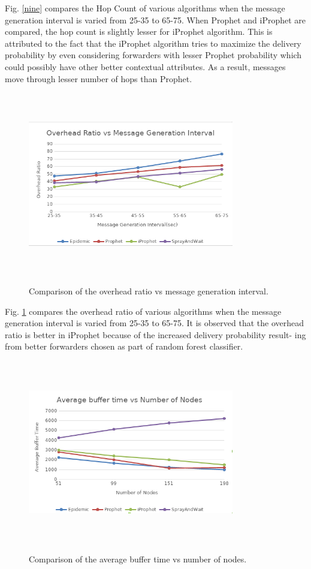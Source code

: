 \documentclass[10pt,journal]{IEEEtran}
\begin{document}
Fig. \ref{nine} compares the Hop Count of various algorithms when the message generation interval is varied from 25-35 to 65-75. When Prophet and iProphet are compared, the hop count is slightly lesser for iProphet algorithm. This is attributed to the fact that the iProphet algorithm tries to maximize the delivery probability by even considering forwarders with lesser Prophet probability which could possibly have other better contextual attributes. As a result, messages move through lesser number of hops than Prophet.


\begin{figure}[H]
\centering
\includegraphics[width=9cm, height=8cm]{oh_ratio_vs_msg_gen_inter.png}\\
\caption{Comparison of the overhead ratio vs message generation interval.}
\label{ten}
\end{figure}

Fig. \ref{ten} compares the overhead ratio of various algorithms
when the message generation interval is varied from 25-35
to 65-75. It is observed that the overhead ratio is better in
iProphet because of the increased delivery probability result-
ing from better forwarders chosen as part of random forest
classifier.

\begin{figure}[H]
	\centering
	\includegraphics[width=9cm, height=8cm]{avg_buff_time_vs_num_of_nodes.png}\\
	\caption{Comparison of the average buffer time vs number of nodes.}
	\label{six}
\end{figure}
\end{document}
